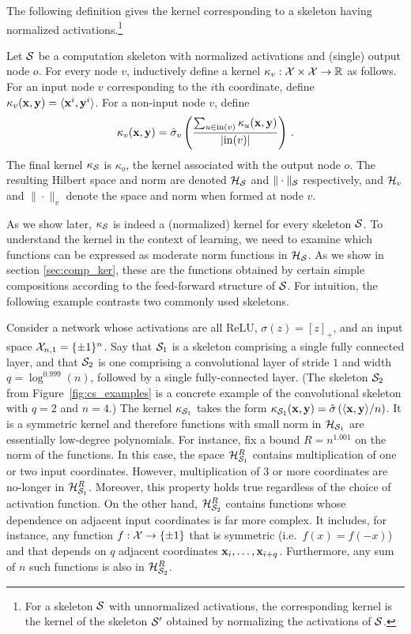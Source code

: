 %
The following definition gives the kernel corresponding to a skeleton
having normalized activations.\footnote{For a skeleton ${\cal S}$ with unnormalized
  activations, the corresponding kernel is the kernel of the skeleton
  ${\cal S}'$ obtained by normalizing the activations of ${\cal S}$.}
%
\begin{definition}\label{def:comp_ker}
%
Let ${\cal S}$ be a computation skeleton with normalized activations and
(single) output node $o$.
%
For every node $v$, inductively define a kernel
$\kappa_v:{\cal X}\times{\cal X}\to{\mathbb R}$ as follows.
%
For an input node $v$ corresponding to the $i$th coordinate,
define $\kappa_{v}({\mathbf x},{\mathbf y})=\langle {\mathbf x}^i, {\mathbf y}^i \rangle$.
%
For a non-input node $v$, define
$$
\kappa_v({\mathbf x},{\mathbf y}) =
	\hat\sigma_v\left(
		\frac{\sum_{u\in \mathrm{in}(v)}\kappa_{u}({\mathbf x},{\mathbf y})}{|\mathrm{in}(v)|}\right) \,.
    $$
The final kernel $\kappa_{\cal S}$ is $\kappa_o$, the kernel associated with
the output node $o$. The resulting Hilbert space and norm are
denoted ${\cal H}_{\cal S}$ and $\|\cdot\|_{\cal S}$ respectively, and
${\cal H}_v$ and $\|\cdot\|_v$ denote the space and norm when formed at node $v$.
\end{definition}
%
\noindent As we show later, $\kappa_{\cal S}$ is indeed a (normalized) kernel for every
skeleton ${\cal S}$. To understand the kernel in the context of learning, we need
to examine which functions can be expressed as moderate
norm functions in ${\cal H}_{\cal S}$. As we show in section \ref{sec:comp_ker},
these are the functions obtained by certain simple compositions according to the
feed-forward structure of ${\cal S}$. For intuition, the following example
contrasts two commonly used skeletons.

\begin{example}
\label{exam:diff_struct}
Consider a network whose activations are all ReLU, $\sigma(z)=[z]_+$,
and an input space ${\cal X}_{n,1}=\{\pm 1\}^n$. Say that ${\cal S}_1$ is a
skeleton comprising a single fully connected layer, and that ${\cal S}_2$ is one comprising
a convolutional layer of stride $1$ and width $q=\log^{0.999}(n)$, followed by a single fully-connected layer. (The skeleton ${\cal S}_2$ from
Figure~\ref{fig:cs_examples} is a concrete example of the convolutional
skeleton with $q=2$ and $n=4$.)
%
The kernel $\kappa_{{\cal S}_1}$ takes the form $\kappa_{{\cal S}_1}({\mathbf x},{\mathbf y}) =
\hat{\sigma} \left({\langle {\mathbf x},{\mathbf y} \rangle}/{n}\right)$. It is a symmetric kernel and
therefore functions with small norm in ${\cal H}_{{\cal S}_1}$ are essentially
low-degree polynomials. For instance, fix a bound $R=n^{1.001}$ on the norm
of the functions.
In this case, the space ${\cal H}^{R}_{{\cal S}_1}$ contains
multiplication of one or two input coordinates. However, multiplication of
$3$ or more coordinates are no-longer in ${\cal H}^{R}_{{\cal S}_1}$. Moreover, this
property holds true regardless of the choice of activation
function. On the other hand, ${\cal H}^{R}_{{\cal S}_2}$ contains functions
whose dependence on adjacent input coordinates is far more complex. It includes,
for instance, any function $f:{\cal X}\to \{\pm 1\}$ that is symmetric
(i.e.\ $f(x)=f(-x)$) and that depends on $q$ adjacent coordinates
${\mathbf x}_{i},\ldots,{\mathbf x}_{i+q}$. Furthermore, any sum of $n$ such functions is
also in ${\cal H}^{R}_{{\cal S}_2}$.
\end{example}
